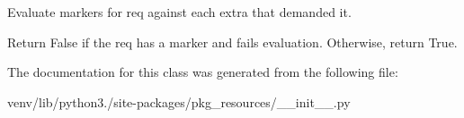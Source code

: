 \begin{DoxyVerb}Evaluate markers for req against each extra that
demanded it.

Return False if the req has a marker and fails
evaluation. Otherwise, return True.
\end{DoxyVerb}
 

The documentation for this class was generated from the following file\+:\begin{DoxyCompactItemize}
\item 
venv/lib/python3./site-\/packages/pkg\+\_\+resources/\+\_\+\+\_\+init\+\_\+\+\_\+.\+py\end{DoxyCompactItemize}
